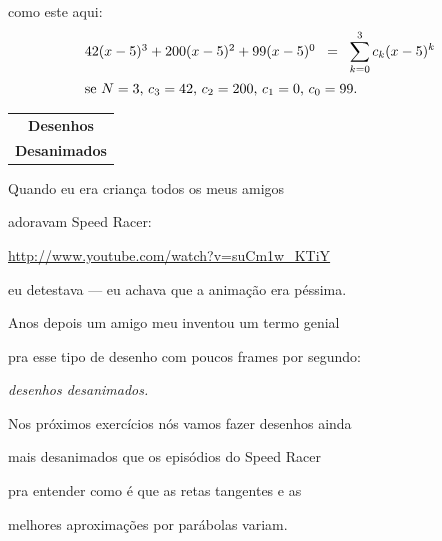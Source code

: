 \documentclass[oneside,12pt]{article}
\begin{document}
como este aqui:
%
$$\begin{array}{l}
  42(x-5)^3 + 200(x-5)^2 + 99(x-5)^0 \;\; = \;\; \displaystyle \sum_{k=0}^3 c_k (x-5)^k \\[15pt]
  \text{se $N=3$, $c_3=42$, $c_2=200$, $c_1=0$, $c_0=99$.} 
  \end{array}
$$


\thispagestyle{empty}

\begin{center}

\vspace*{2cm}

\begin{tabular}{c}
{\Large \bf Desenhos} \\[2.5pt]
{\Large \bf Desanimados} \\
\end{tabular}

\end{center}

\newpage


Quando eu era criança todos os meus amigos

adoravam Speed Racer:

\ssk

{\footnotesize

\url{http://www.youtube.com/watch?v=suCm1w_KTiY}

}

\ssk

eu detestava --- eu achava que a animação era péssima.

\msk

Anos depois um amigo meu inventou um termo genial

pra esse tipo de desenho com poucos frames por segundo:

{\sl desenhos desanimados.}

\msk

Nos próximos exercícios nós vamos fazer desenhos ainda

mais desanimados que os episódios do Speed Racer

pra entender como é que as retas tangentes e as

melhores aproximações por parábolas variam.

\newpage

\end{document}
